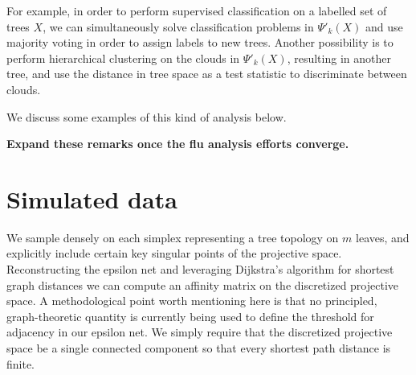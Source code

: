 \documentclass[a4paper,11pt]{article}
\begin{document}
For example, in order to perform supervised classification on a labelled set of trees $X$, we can simultaneously solve classification problems in $\Psi'_k(X)$ and use majority voting in order to assign labels to new trees.
Another possibility is to perform hierarchical clustering on the clouds in $\Psi'_k(X)$, resulting in another tree, and use the distance in tree space as a test statistic to discriminate between clouds.

We discuss some examples of this kind of analysis below.

{\bf Expand these remarks once the flu analysis efforts converge.}

\section{Simulated data}\label{sec:simulated}

We sample densely on each simplex representing a tree topology on $m$ leaves, and explicitly include certain key singular points of the projective space.
Reconstructing the epsilon net and leveraging Dijkstra's algorithm for shortest graph distances we can compute an affinity matrix on the discretized projective space.
A methodological point worth mentioning here is that no principled, graph-theoretic quantity is currently being used to define the threshold for adjacency in our epsilon net.
We simply require that the discretized projective space be a single connected component so that every shortest path distance is finite.
\end{document}
